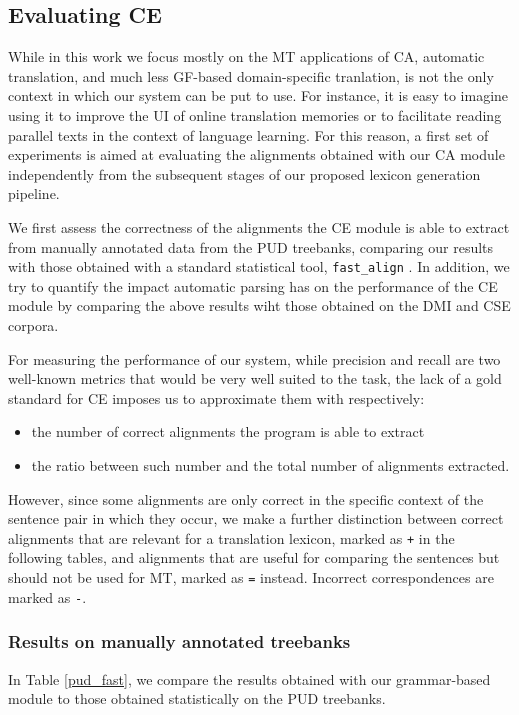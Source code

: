 \documentclass[11pt]{article}
\begin{document}

\subsection{Evaluating CE} %
While in this work we focus mostly on the MT applications of CA, automatic translation, and much less GF-based domain-specific tranlation, is not the only context in which our system can be put to use. 
For instance, it is easy to imagine using it to improve the UI of online translation memories or to facilitate reading parallel texts in the context of language learning.
For this reason, a first set of experiments is aimed at evaluating the alignments obtained with our CA module independently from the subsequent stages of our proposed lexicon generation pipeline.

We first assess the correctness of the alignments the CE module is able to extract from manually annotated data from the PUD treebanks, comparing our results with those obtained with a standard statistical tool, \texttt{fast\_align} \cite{dyer-etal-2013-simple}. 
In addition, we try to quantify the impact automatic parsing has on the performance of the CE module by comparing the above results wiht those obtained on the DMI and CSE corpora.

For measuring the performance of our system, while precision and recall are two well-known metrics that would be very well suited to the task, the lack of a gold standard for CE imposes us to approximate them with respectively:

\begin{itemize}
  \item the number of correct alignments the program is able to extract
  \item the ratio between such number and the total number of alignments extracted.
 \end{itemize}

However, since some alignments are only correct in the specific context of the sentence pair in which they occur, we make a further distinction between correct alignments that are relevant for a translation lexicon, marked as \texttt{+} in the following tables, and alignments that are useful for comparing the sentences but should not be used for MT, marked as \texttt{=} instead.  %
Incorrect correspondences are marked as \texttt{-}. 

\subsubsection{Results on manually annotated treebanks} 
In Table \ref{pud_fast}, we compare the results obtained with our grammar-based module to those obtained statistically on the PUD treebanks. 
\end{document}
